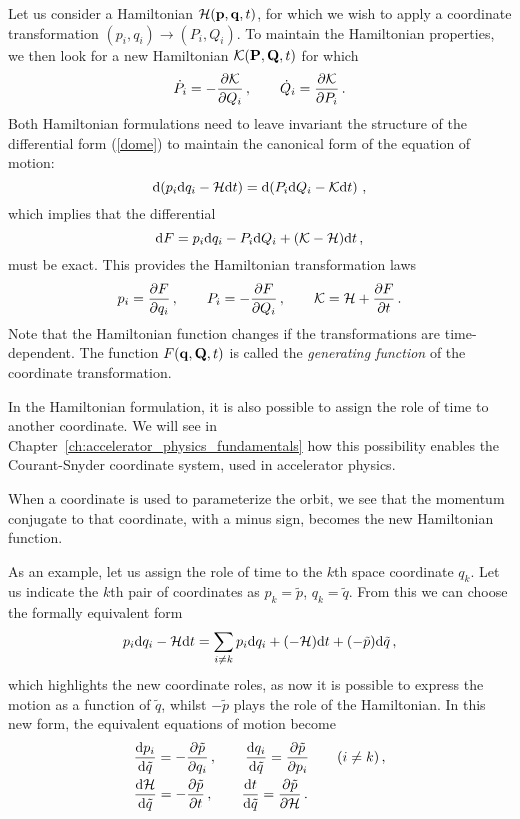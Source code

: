 Let us consider a Hamiltonian $\mathcal{H}(\vb{p},\vb{q},t)$, for which we wish to apply a coordinate transformation $(p_i,q_i)\to(P_i,Q_i)$. To maintain the Hamiltonian properties, we then look for a new Hamiltonian $\mathcal{K}(\vb{P},\vb{Q},t)$ for which
%
\begin{equation}
    \dot P_i = -\pdv{\mathcal{K}}{Q_i}\,, \qquad \dot Q_i = \pdv{\mathcal{K}}{P_i}\,.
\end{equation}
%
Both Hamiltonian formulations need to leave invariant the structure of the differential form (\ref{dome}) to maintain the canonical form of the equation of motion:
%
\begin{equation}
    \dd (p_i \dd q_i- \mathcal{H} \dd t) = \dd(P_i \dd Q_i - \mathcal{K}\dd t)\,,
\end{equation}
%
which implies that the differential
%
\begin{equation}
    \dd F = p_i\dd q_i - P_i \dd Q_i + (\mathcal{K}-\mathcal{H})\dd t\, ,
\end{equation}
%
must be exact. This provides the Hamiltonian transformation laws
%
\begin{equation} 
	p_i = \pdv{F}{q_i}\,, \qquad P_i = -\pdv{F}{Q_i}\,, \qquad \mathcal{K}=\mathcal{H}+\pdv{F}{t}\,.
\end{equation}
%
Note that the Hamiltonian function changes if the transformations are time-dependent. The function $F(\vb{q},\vb{Q},t)$ is called the \textit{generating function} of the coordinate transformation.

In the Hamiltonian formulation, it is also possible to assign the role of time to another coordinate. We will see in Chapter~\ref{ch:accelerator_physics_fundamentals} how this possibility enables the Courant-Snyder coordinate system, used in accelerator physics.

When a coordinate is used to parameterize the orbit, we see that the momentum conjugate to that coordinate, with a minus sign, becomes the new Hamiltonian function.

As an example, let us assign the role of time to the $k$th space coordinate $q_k$. Let us indicate the $k$th pair of coordinates as $p_k = \tilde p$, $q_k=\tilde q$. From this we can choose the formally equivalent form
%
\begin{equation}
    p_i \dd q_i - \mathcal{H} \dd t = \sum_{i\neq k} p_i \dd q_i + (-\mathcal{H})\dd t + (-\tilde p)\dd\tilde q\,,
\end{equation}
%
which highlights the new coordinate roles, as now it is possible to express the motion as a function of $\tilde q$, whilst $-\tilde p$ plays the role of the Hamiltonian. In this new form, the equivalent equations of motion become
%
\begin{equation} 
\begin{split}
	&\dv{p_i}{\tilde q} = -\pdv{\tilde p}{q_i}\,, \qquad \dv{q_i}{\tilde q} = \pdv{\tilde p}{p_i} \qquad (i\neq k)\,, \\
	&\dv{\mathcal{H}}{\tilde q} = -\pdv{\tilde p}{t}\,,  \qquad \dv{t}{\tilde q} = \pdv{\tilde p}{\mathcal{H}}\,. 
\end{split}
\end{equation}

